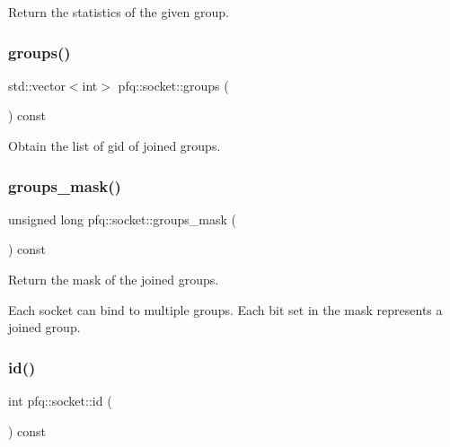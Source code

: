 Return the statistics of the given group. 

\mbox{\label{classpfq_1_1socket_a6b850a0f5acec17e153c16cdfca16d52}} 
\subsubsection{\texorpdfstring{groups()}{groups()}}
{\footnotesize\ttfamily std\+::vector$<$int$>$ pfq\+::socket\+::groups (\begin{DoxyParamCaption}{ }\end{DoxyParamCaption}) const\hspace{0.3cm}{\ttfamily [inline]}}



Obtain the list of gid of joined groups. 

\mbox{\label{classpfq_1_1socket_a136c71dc2292218fe43246770cf109da}} 
\subsubsection{\texorpdfstring{groups\+\_\+mask()}{groups\_mask()}}
{\footnotesize\ttfamily unsigned long pfq\+::socket\+::groups\+\_\+mask (\begin{DoxyParamCaption}{ }\end{DoxyParamCaption}) const\hspace{0.3cm}{\ttfamily [inline]}}



Return the mask of the joined groups. 

Each socket can bind to multiple groups. Each bit set in the mask represents a joined group. \mbox{\label{classpfq_1_1socket_a78e4376b28f6eef5b126018197522d30}} 
\subsubsection{\texorpdfstring{id()}{id()}}
{\footnotesize\ttfamily int pfq\+::socket\+::id (\begin{DoxyParamCaption}{ }\end{DoxyParamCaption}) const\hspace{0.3cm}{\ttfamily [inline]}}



